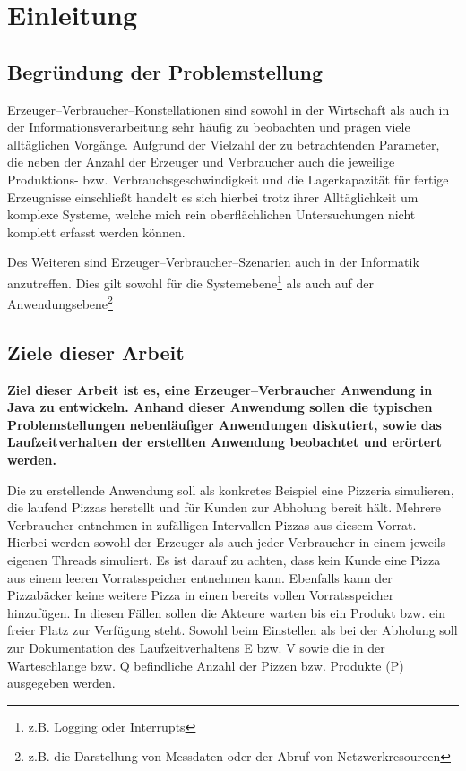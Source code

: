 \section{Einleitung} %
\label{sec:einleitung}

\subsection{Begründung der Problemstellung} %
\label{sub:begrundung_der_problemstellung}
Erzeuger–Verbraucher–Konstellationen sind sowohl in der Wirtschaft als auch in der Informationsverarbeitung sehr häufig zu beobachten und prägen viele alltäglichen Vorgänge. Aufgrund der Vielzahl der zu betrachtenden Parameter, die neben der Anzahl der Erzeuger und Verbraucher auch die jeweilige Produktions- bzw. Verbrauchsgeschwindigkeit und die Lagerkapazität für fertige Erzeugnisse einschließt handelt es sich hierbei trotz ihrer Alltäglichkeit um komplexe Systeme, welche mich rein oberflächlichen Untersuchungen nicht komplett erfasst werden können.

Des Weiteren sind Erzeuger–Verbraucher–Szenarien auch in der Informatik anzutreffen. Dies gilt sowohl für die Systemebene\footnote{z.B. Logging oder Interrupts} als auch auf der Anwendungsebene\footnote{z.B. die Darstellung von Messdaten oder der Abruf von Netzwerkresourcen}


\subsection{Ziele dieser Arbeit} %
\label{sub:ziele_dieser_arbeit}
\textbf{Ziel dieser Arbeit ist es, eine Erzeuger–Verbraucher Anwendung in Java zu entwickeln. Anhand dieser Anwendung sollen die typischen Problemstellungen nebenläufiger Anwendungen diskutiert, sowie das Laufzeitverhalten der erstellten Anwendung beobachtet und erörtert werden.}

Die zu erstellende Anwendung soll als konkretes Beispiel eine Pizzeria simulieren, die laufend Pizzas herstellt und für Kunden zur Abholung bereit hält. Mehrere Verbraucher entnehmen in zufälligen Intervallen Pizzas aus diesem Vorrat. Hierbei werden sowohl der Erzeuger als auch jeder Verbraucher in einem jeweils eigenen Threads simuliert.  Es ist darauf zu achten, dass kein Kunde eine Pizza aus einem leeren Vorratsspeicher entnehmen kann. Ebenfalls kann der Pizzabäcker keine weitere Pizza in einen bereits vollen Vorratsspeicher hinzufügen. In diesen Fällen sollen die Akteure warten bis ein Produkt bzw. ein freier Platz zur Verfügung steht. Sowohl beim Einstellen als bei der Abholung soll zur Dokumentation des Laufzeitverhaltens \ac{E} bzw. \ac{V} sowie die in der Warteschlange bzw. \ac{Q} befindliche Anzahl der Pizzen bzw. Produkte (P) ausgegeben werden.

